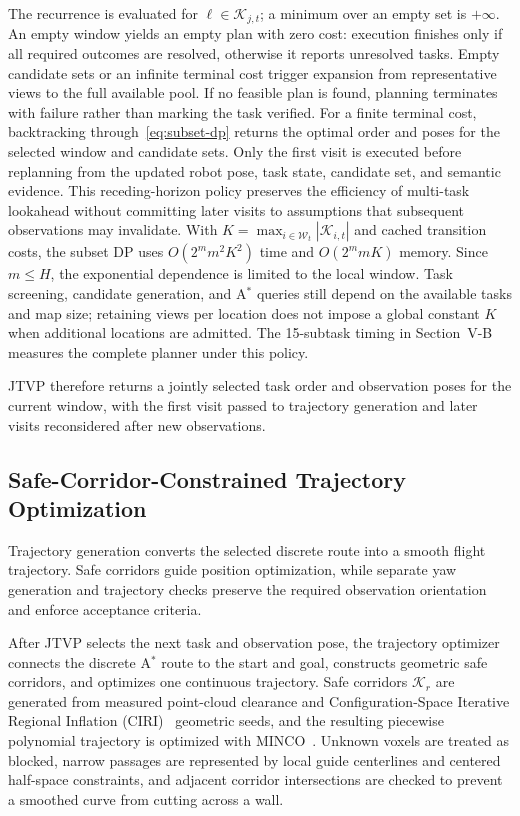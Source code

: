 \documentclass[letterpaper,10pt,journal]{IEEEtran}
\begin{document}
The recurrence is evaluated for $\ell\in\mathcal K_{j,t}$; a minimum over an empty set is $+\infty$. An empty window yields an empty plan with zero cost: execution finishes only if all required outcomes are resolved, otherwise it reports unresolved tasks. Empty candidate sets or an infinite terminal cost trigger expansion from representative views to the full available pool. If no feasible plan is found, planning terminates with failure rather than marking the task verified. For a finite terminal cost, backtracking through~\eqref{eq:subset-dp} returns the optimal order and poses for the selected window and candidate sets. Only the first visit is executed before replanning from the updated robot pose, task state, candidate set, and semantic evidence. This receding-horizon policy preserves the efficiency of multi-task lookahead without committing later visits to assumptions that subsequent observations may invalidate. With $K=\max_{i\in\mathcal W_t}|\mathcal K_{i,t}|$ and cached transition costs, the subset DP uses $O(2^m m^2K^2)$ time and $O(2^m mK)$ memory. Since $m\leq H$, the exponential dependence is limited to the local window. Task screening, candidate generation, and A$^*$ queries still depend on the available tasks and map size; retaining views per location does not impose a global constant $K$ when additional locations are admitted. The 15-subtask timing in Section~V-B measures the complete planner under this policy.

JTVP therefore returns a jointly selected task order and observation poses for the current window, with the first visit passed to trajectory generation and later visits reconsidered after new observations.

\subsection{Safe-Corridor-Constrained Trajectory Optimization}

Trajectory generation converts the selected discrete route into a smooth flight trajectory. Safe corridors guide position optimization, while separate yaw generation and trajectory checks preserve the required observation orientation and enforce acceptance criteria.

After JTVP selects the next task and observation pose, the trajectory optimizer connects the discrete A$^*$ route to the start and goal, constructs geometric safe corridors, and optimizes one continuous trajectory. Safe corridors $\mathcal K_r$ are generated from measured point-cloud clearance and Configuration-Space Iterative Regional Inflation (CIRI)~\cite{ren2025super} geometric seeds, and the resulting piecewise polynomial trajectory is optimized with MINCO~\cite{wang2022minco}. Unknown voxels are treated as blocked, narrow passages are represented by local guide centerlines and centered half-space constraints, and adjacent corridor intersections are checked to prevent a smoothed curve from cutting across a wall.
\end{document}

